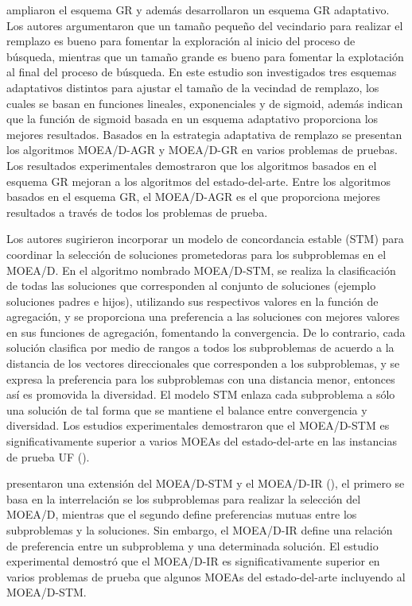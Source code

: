 \citeauthor{wang2016adaptive} ampliaron el esquema GR y además desarrollaron un esquema GR adaptativo.
%
Los autores argumentaron que un tamaño pequeño del vecindario para realizar el remplazo es bueno para fomentar la exploración al inicio del proceso de búsqueda, mientras que un tamaño grande es bueno para fomentar la explotación al final del proceso de búsqueda.
%
En este estudio son investigados tres esquemas adaptativos distintos para ajustar el tamaño de la vecindad de remplazo, los cuales se basan en funciones lineales, exponenciales y de sigmoid, además indican que la función de sigmoid basada en un esquema adaptativo proporciona los mejores resultados.
%
Basados en la estrategia adaptativa de remplazo se presentan los algoritmos MOEA/D-AGR y MOEA/D-GR en varios problemas de pruebas.
%
Los resultados experimentales demostraron que los algoritmos basados en el esquema GR mejoran a los algoritmos del estado-del-arte.
%
Entre los algoritmos basados en el esquema GR, el MOEA/D-AGR es el que proporciona mejores resultados a través de todos los problemas de prueba.


Los autores \citeauthor{li2014stable} sugirieron incorporar un modelo de concordancia estable (STM) para coordinar la selección de soluciones prometedoras para los subproblemas en el MOEA/D.
%
En el algoritmo nombrado MOEA/D-STM, se realiza la clasificación de todas las soluciones que corresponden al conjunto de soluciones (ejemplo soluciones padres e hijos), utilizando sus respectivos valores en la función de agregación, y se proporciona una preferencia a las soluciones con mejores valores en sus funciones de agregación, fomentando la convergencia.
%
De lo contrario, cada solución clasifica por medio de rangos a todos los subproblemas de acuerdo a la distancia de los vectores direccionales que corresponden a los subproblemas, y se expresa la preferencia para los subproblemas con una distancia menor, entonces así es promovida la diversidad.
%
El modelo STM enlaza cada subproblema a sólo una solución de tal forma que se mantiene el balance entre convergencia y diversidad.
%
Los estudios experimentales demostraron que el MOEA/D-STM es significativamente superior a varios MOEAs del estado-del-arte en las instancias de prueba UF (\cite{zhang2008multiobjective}).


\citeauthor{li2015interrelationship} presentaron una extensión del MOEA/D-STM y el MOEA/D-IR (\cite{li2014stable}), el primero se basa en la interrelación se los subproblemas para realizar la selección del MOEA/D, mientras que el segundo define preferencias mutuas entre los subproblemas y la soluciones.
%
Sin embargo, el MOEA/D-IR define una relación de preferencia entre un subproblema y una determinada solución.
%
El estudio experimental demostró que el MOEA/D-IR es significativamente superior en varios problemas de prueba que algunos MOEAs del estado-del-arte incluyendo al MOEA/D-STM.

